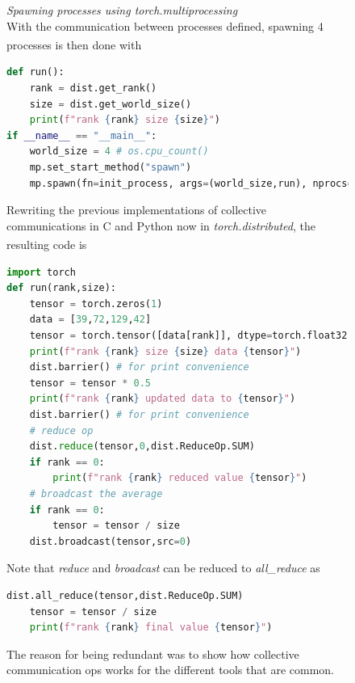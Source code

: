 \documentclass[12pt]{article}
\newcommand{\customtext}[3]{%
    \vspace{#2} %
    \fontsize{13}{8}\textcolor{#1}{\textit{#3}}%
}
\newcommand{\sidecite}[1]{\textsuperscript{\textcolor{blue}{\textbf{\scriptsize#1}}}}
\newcommand{\maincitecount}{\sidecite{\stepcounter{maincite}\themaincite}}
\begin{document}
\begin{figure}[!htb]
    \begin{minipage}[t]{0.65\textwidth}
    \customtext{xtitle}{0em}{Spawning processes using torch.multiprocessing}\\
    With the communication between processes defined, spawning 4 processes is then 
    done with \maincitecount
\begin{lstlisting}[language=python,style=python,basicstyle=\ttfamily\footnotesize]
def run():
    rank = dist.get_rank()
    size = dist.get_world_size()
    print(f"rank {rank} size {size}")
if __name__ == "__main__":
    world_size = 4 # os.cpu_count()
    mp.set_start_method("spawn")
    mp.spawn(fn=init_process, args=(world_size,run), nprocs=world_size, join=True)
\end{lstlisting}
Rewriting the previous implementations of collective communications in C and Python
now in {\it \color{xlink}torch.distributed}, the resulting code is\maincitecount
\begin{lstlisting}[language=python,style=python,basicstyle=\ttfamily\footnotesize]
import torch
def run(rank,size):
    tensor = torch.zeros(1)
    data = [39,72,129,42]
    tensor = torch.tensor([data[rank]], dtype=torch.float32)
    print(f"rank {rank} size {size} data {tensor}")
    dist.barrier() # for print convenience
    tensor = tensor * 0.5
    print(f"rank {rank} updated data to {tensor}")
    dist.barrier() # for print convenience
    # reduce op
    dist.reduce(tensor,0,dist.ReduceOp.SUM)
    if rank == 0:
        print(f"rank {rank} reduced value {tensor}")
    # broadcast the average
    if rank == 0:
        tensor = tensor / size
    dist.broadcast(tensor,src=0)
\end{lstlisting}
Note that {\it reduce} and {\it broadcast} can be reduced to {\it all\_reduce} as 
\begin{lstlisting}[language=python,style=python,basicstyle=\ttfamily\footnotesize]
    dist.all_reduce(tensor,dist.ReduceOp.SUM)
    tensor = tensor / size
    print(f"rank {rank} final value {tensor}")
\end{lstlisting}
The reason for being redundant was to show how collective communication 
ops works for the different tools that are common.
\end{minipage}%
\hspace{25pt}
\begin{minipage}[t]{.4\textwidth}

\end{minipage}
\end{figure}
\end{document}
